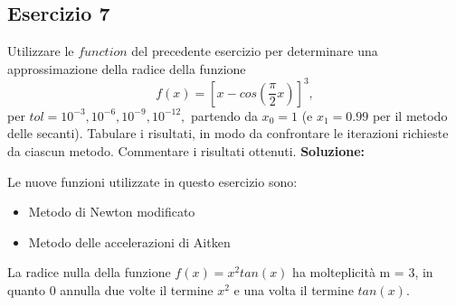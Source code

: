 \subsection{Esercizio 7}
Utilizzare le $function$ del precedente esercizio per determinare una approssimazione
della radice della funzione
\[
    f(x) = \left[x - cos(\frac{\pi}{2}x)\right]^3,
\]
per $tol = 10^{-3}, 10^{-6}, 10^{-9}, 10^{-12},$ partendo da $x_0 = 1$
(e $x_1 = 0.99$ per il metodo delle secanti). Tabulare i risultati,
in modo da confrontare le iterazioni richieste da ciascun metodo. Commentare
i risultati ottenuti.
\newline \textbf{Soluzione:}












Le nuove funzioni utilizzate in  questo esercizio sono:
\begin{itemize}
    \item Metodo di Newton modificato
          
    \item Metodo delle accelerazioni di Aitken
          
\end{itemize}
La radice nulla della funzione $f(x)=x^2tan(x)$ ha molteplicità m = 3, in quanto $0$ annulla due volte il termine
$x^2$ e una volta il termine $tan(x)$.



